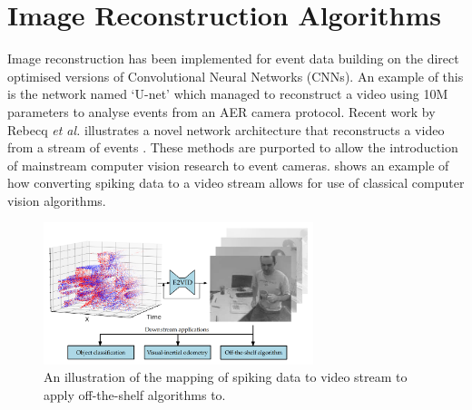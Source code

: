 
\section{Image Reconstruction Algorithms} \label{ssec:image_reconstruction}

Image reconstruction has been implemented for event data building on the direct optimised versions of Convolutional Neural Networks (CNNs). An example of this is the network named `U-net'\cite{UNET} which managed to reconstruct a video using 10M parameters to analyse events from an AER camera protocol. Recent work by Rebecq \textit{et al.} illustrates a novel network architecture that reconstructs a video from a stream of events \cite{spikingToVideo}. These methods are purported to allow the introduction of mainstream computer vision research to event cameras.  shows an example of how converting spiking data to a video stream allows for use of classical computer vision algorithms.

\begin{figure}[htb]
      \centering
      \includegraphics[width=0.7\textwidth]{background/images/spikes_to_video.png}
      \caption{An illustration of the mapping of spiking data to video stream to apply off-the-shelf algorithms to\cite{spikingToVideo}.}
      \label{fig:spikes_to_video}
\end{figure}

